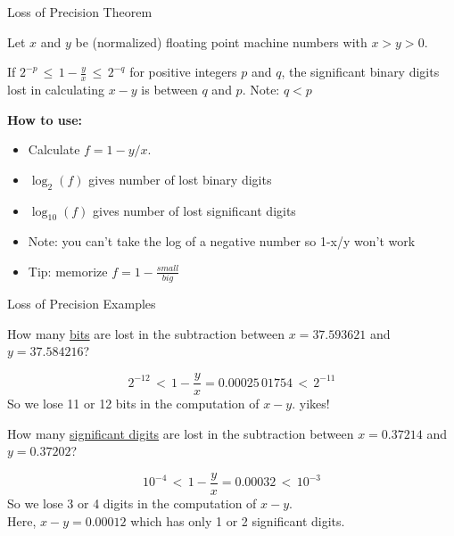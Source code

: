 \documentclass[10pt]{beamer}
\begin{document}
\begin{frame}{Loss of Precision Theorem}

\begin{theorem}
    
Let $x$ and $y$ be (normalized) floating point machine numbers with
$x>y>0$.
\bigskip

If $2^{-p} \,\leq\, 1-\frac{y}{x} \,\leq\, 2^{-q}$ for positive integers $p$
and $q$, the significant binary digits lost in calculating $x-y$ is between $q$ and $p$.
Note: $q < p$
\end{theorem}

\bigskip 
\textbf{How to use:}
\begin{itemize}
    \item Calculate $f = 1-y/x$.
    \item $\log_2(f)$ gives number of lost binary digits 
    \item $\log_{10}(f)$ gives number of lost significant digits
\vspace{5mm}
    \item Note: you can't take the log of a negative number so 1-x/y won't work
    \item Tip: memorize $f = 1-\frac{small}{big}$
    

\end{itemize}
\end{frame}
\begin{frame}{Loss of Precision Examples}
\begin{example}
  How many \underline{bits} are lost in the subtraction between $x=37.593621$ and $y=37.584216$?
\end{example}
\begin{equation*}
  2^{-12} \,<\, 1-\frac{y}{x} = 0.00025\,01754 \,<\, 2^{-11}
\end{equation*}
So we lose 11 or 12 bits in the computation of $x-y$.  yikes!
\begin{example}
How many \underline{significant digits} are lost in the subtraction between $x = 0.37214$ and
  $y = 0.37202$?
\end{example}
\begin{equation*}
  10^{-4} \,<\, 1-\frac{y}{x} = 0.00032 \,<\, 10^{-3}
\end{equation*}
   So we lose 3 or 4 digits in the computation of $x-y$.\\
Here, $x-y=0.00012$ which has only 1 or 2 significant digits.
\end{frame}
\end{document}
